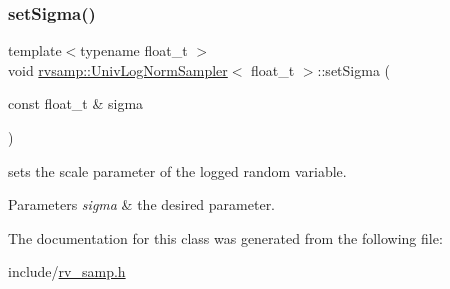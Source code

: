 \subsubsection{\texorpdfstring{set\+Sigma()}{setSigma()}}
{\footnotesize\ttfamily template$<$typename float\+\_\+t $>$ \\
void \hyperlink{classrvsamp_1_1UnivLogNormSampler}{rvsamp\+::\+Univ\+Log\+Norm\+Sampler}$<$ float\+\_\+t $>$\+::set\+Sigma (\begin{DoxyParamCaption}\item[{const float\+\_\+t \&}]{sigma }\end{DoxyParamCaption})}



sets the scale parameter of the logged random variable. 


\begin{DoxyParams}{Parameters}
{\em sigma} & the desired parameter. \\
\hline
\end{DoxyParams}


The documentation for this class was generated from the following file\+:\begin{DoxyCompactItemize}
\item 
include/\hyperlink{rv__samp_8h}{rv\+\_\+samp.\+h}\end{DoxyCompactItemize}
